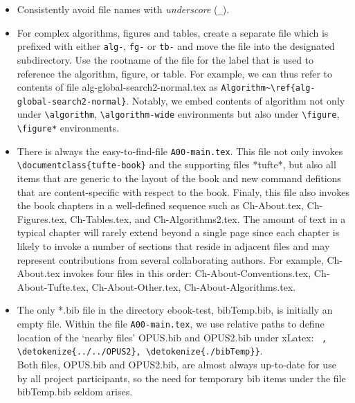 \begin{itemize}
\item
Consistently avoid file names with {\em underscore} (\verb+_+).
\item
For complex algorithms, figures and tables, create a separate file which is
prefixed with either \verb+alg-+, \verb+fg-+ or \verb+tb-+
and move the file into the designated subdirectory.
Use the rootname of the file for the label that is used to reference the 
algorithm, figure, or table. For example, we can thus refer to 
contents of file alg-global-search2-normal.tex as 
\verb+Algorithm~\ref{alg-global-search2-normal}+.
Notably, we embed contents of algorithm not only under
\verb+\algorithm+, \verb+\algorithm-wide+ environments but also under 
\verb+\figure+, \verb+\figure*+ environments.
\item
There is always the easy-to-find-file \verb+A00-main.tex+.
This file not only invokes \verb+\documentclass{tufte-book}+
and  the supporting files *tufte*, but also all 
items that are generic to the layout of the book and
new command defitions that are  content-specific with respect to the book.
Finaly, this file also
invokes the book chapters in a well-defined sequence such as 
Ch-About.tex, Ch-Figures.tex, Ch-Tables.tex, and Ch-Algorithms2.tex.
The amount of text in a typical chapter will rarely extend beyond a single page 
since each chapter is likely to invoke
a number of sections that reside in adjacent files and
may represent contributions from several collaborating authors. 
For example, Ch-About.tex invokes four files in this order:
 Ch-About-Conventions.tex,  Ch-About-Tufte.tex, 
  Ch-About-Other.tex,  Ch-About-Algorithms.tex.
\item
The only  *.bib file in the directory ebook-test, bibTemp.bib,
is initially an empty file. 
Within the file \verb+A00-main.tex+, we use relative paths to define
location of the `nearby files' OPUS.bib and OPUS2.bib under xLatex:~
\verb+,+\\
\verb+\detokenize{../../OPUS2}, \detokenize{./bibTemp}}+.\\
Both files, OPUS.bib and OPUS2.bib, are almost always up-to-date
for use by all project participants, so the need for
temporary bib items under the file bibTemp.bib seldom arises.

\end{itemize}

